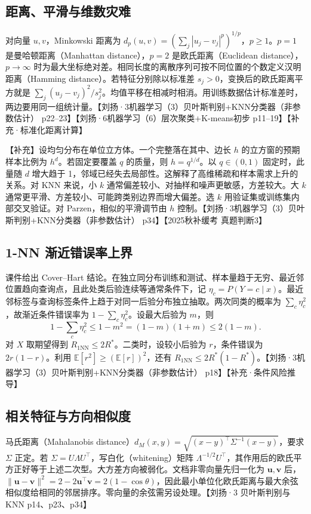 \documentclass[UTF8,a4paper,zihao=-4,fontset=fandol]{ctexrep}
\begin{document}
\subsection*{距离、平滑与维数灾难}
对向量 $u,v$，Minkowski 距离为 $d_p(u,v)=(\sum_j|u_j-v_j|^p)^{1/p}$，$p\ge1$。$p=1$ 是曼哈顿距离（Manhattan distance），$p=2$ 是欧氏距离（Euclidean distance），$p\to\infty$ 时为最大坐标绝对差。相同长度的离散序列可按不同位置的个数定义汉明距离（Hamming distance）。若特征分别除以标准差 $s_j>0$，变换后的欧氏距离平方就是 $\sum_j(u_j-v_j)^2/s_j^2$。均值平移在相减时相消。用训练数据估计标准差时，两边要用同一组统计量。【刘扬·3机器学习（3）贝叶斯判别+KNN分类器（非参数估计） p22–23】【刘扬·6机器学习（6）层次聚类+K-means初步 p11–19】【补充·标准化距离计算】

【补充】设均匀分布在单位立方体。一个完整落在其中、边长 $h$ 的立方窗的预期样本比例为 $h^d$。若固定要覆盖 $q$ 的质量，则 $h=q^{1/d}$。以 $q\in(0,1)$ 固定时，此量随 $d$ 增大趋于 1，邻域已经失去局部性。这解释了高维稀疏和样本需求上升的关系。对 KNN 来说，小 $k$ 通常偏差较小、对抽样和噪声更敏感，方差较大。大 $k$ 通常更平滑、方差较小、可能跨类别边界而增大偏差。选 $k$ 用验证集或训练集内部交叉验证。对 Parzen，相似的平滑调节由 $h$ 控制。【刘扬·3机器学习（3）贝叶斯判别+KNN分类器（非参数估计） p34】【2025秋补缓考 真题判断3】

\subsection*{1-NN 渐近错误率上界}
课件给出 Cover–Hart 结论。在独立同分布训练和测试、样本量趋于无穷、最近邻位置趋向查询点，且此处类后验连续等通常条件下，记 $\eta_c=P(Y=c\mid x)$。最近邻标签与查询标签条件上趋于对同一后验分布独立抽取。两次同类的概率为 $\sum_c\eta_c^2$，故渐近条件错误率为 $1-\sum_c\eta_c^2$。设最大后验为 $m$，则
\[
 1-\sum_c\eta_c^2\le 1-m^2=(1-m)(1+m)\le 2(1-m).
\]
对 $X$ 取期望得到 $R_{1\mathrm{NN}}\le2R^*$。二类时，设较小后验为 $r$，条件错误为 $2r(1-r)$。利用 $\mathbb E[r^2]\ge(\mathbb E[r])^2$，还有 $R_{1\mathrm{NN}}\le2R^*(1-R^*)$。【刘扬·3机器学习（3）贝叶斯判别+KNN分类器（非参数估计） p18】【补充·条件风险推导】

\subsection*{相关特征与方向相似度}
马氏距离（Mahalanobis distance）$d_M(x,y)=\sqrt{(x-y)^\top\Sigma^{-1}(x-y)}$，要求 $\Sigma$ 正定。若 $\Sigma=U\Lambda U^\top$，写白化（whitening）矩阵 $\Lambda^{-1/2}U^\top$，其作用后的欧氏平方正好等于上述二次型。大方差方向被弱化。文档非零向量先归一化为 $\bm u,\bm v$ 后，$\|\bm u-\bm v\|^2=2-2\bm u^\top\bm v=2(1-\cos\theta)$，因此最小单位化欧氏距离与最大余弦相似度给相同的邻居排序。零向量的余弦需另设处理。【刘扬·3 贝叶斯判别与KNN p14、p23、p34】
\end{document}
